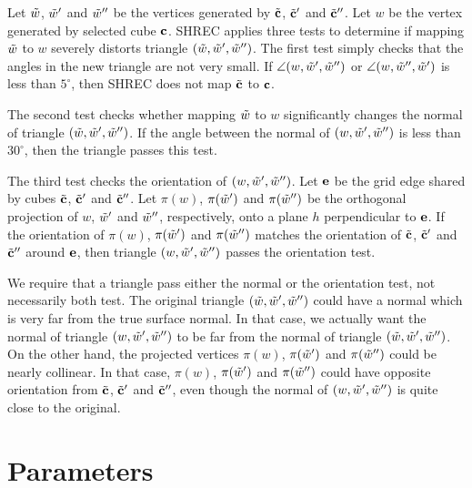 Let $\tilde{w}$, $\tilde{w}'$ and $\tilde{w}''$ be the vertices generated
by ${\tilde{\mathbf{c}}}$, ${\tilde{\mathbf{c}}}'$ and ${\tilde{\mathbf{c}}}''$.
Let $w$ be the vertex generated by selected cube $\mathbf{c}$.
SHREC applies three tests to determine if mapping $\tilde{w}$ to $w$
severely distorts triangle $(\tilde{w},\tilde{w}',\tilde{w}'')$.
The first test simply checks that the angles in the new triangle
are not very small.
If $\angle(w,\tilde{w}',\tilde{w}'')$ or $\angle(w,\tilde{w}'',\tilde{w}')$ is less than $5^\circ$,
then SHREC does not map ${\tilde{\mathbf{c}}}$ to $\mathbf{c}$.

The second test checks whether mapping $\tilde{w}$ to $w$
significantly changes the normal of triangle $(\tilde{w},\tilde{w}',\tilde{w}'')$.
If the angle between the normal of $(w, \tilde{w}', \tilde{w}'')$ is less than $30^\circ$,
then the triangle passes this test.

The third test checks the orientation of $(w, \tilde{w}', \tilde{w}'')$.
Let $\mathbf{e}$ be the grid edge shared by cubes ${\tilde{\mathbf{c}}}$, ${\tilde{\mathbf{c}}}'$ and ${\tilde{\mathbf{c}}}''$.
Let $\pi(w)$, $\pi(\tilde{w}')$ and $\pi(\tilde{w}'')$ be the orthogonal projection
of $w$, $\tilde{w}'$ and $\tilde{w}''$, respectively, 
onto a plane $h$ perpendicular to $\mathbf{e}$.
If the orientation of $\pi(w)$, $\pi(\tilde{w}')$ and $\pi(\tilde{w}'')$
matches the orientation of ${\tilde{\mathbf{c}}}$, ${\tilde{\mathbf{c}}}'$ and ${\tilde{\mathbf{c}}}''$ around $\mathbf{e}$,
then triangle $(w,\tilde{w}',\tilde{w}'')$ passes the orientation test.

We require that a triangle pass either the normal or the orientation test,
not necessarily both test.
The original triangle $(\tilde{w},\tilde{w}',\tilde{w}'')$ could have a normal which
is very far from the true surface normal.
In that case, we actually want the normal of triangle $(w, \tilde{w}', \tilde{w}'')$
to be far from the normal of triangle $(\tilde{w}, \tilde{w}', \tilde{w}'')$.
On the other hand,
the projected vertices $\pi(w)$, $\pi(\tilde{w}')$ and $\pi(\tilde{w}'')$
could be nearly collinear.
In that case, $\pi(w)$, $\pi(\tilde{w}')$ and $\pi(\tilde{w}'')$ could have
opposite orientation from ${\tilde{\mathbf{c}}}$, ${\tilde{\mathbf{c}}}'$ and ${\tilde{\mathbf{c}}}''$,
even though the normal of $(w,\tilde{w}',\tilde{w}'')$ is quite close
to the original.


\section{Parameters}
\label{section:parameters}

